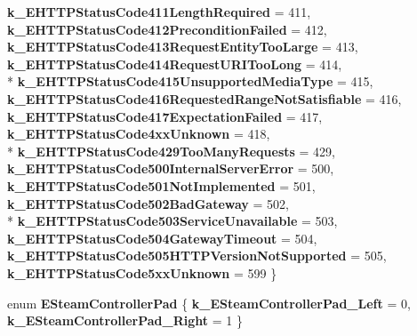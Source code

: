 \begin{DoxyCompactItemize}
{\bfseries k\+\_\+\+E\+H\+T\+T\+P\+Status\+Code411\+Length\+Required} = 411, 
{\bfseries k\+\_\+\+E\+H\+T\+T\+P\+Status\+Code412\+Precondition\+Failed} = 412, 
{\bfseries k\+\_\+\+E\+H\+T\+T\+P\+Status\+Code413\+Request\+Entity\+Too\+Large} = 413, 
{\bfseries k\+\_\+\+E\+H\+T\+T\+P\+Status\+Code414\+Request\+U\+R\+I\+Too\+Long} = 414, 
\\*
{\bfseries k\+\_\+\+E\+H\+T\+T\+P\+Status\+Code415\+Unsupported\+Media\+Type} = 415, 
{\bfseries k\+\_\+\+E\+H\+T\+T\+P\+Status\+Code416\+Requested\+Range\+Not\+Satisfiable} = 416, 
{\bfseries k\+\_\+\+E\+H\+T\+T\+P\+Status\+Code417\+Expectation\+Failed} = 417, 
{\bfseries k\+\_\+\+E\+H\+T\+T\+P\+Status\+Code4xx\+Unknown} = 418, 
\\*
{\bfseries k\+\_\+\+E\+H\+T\+T\+P\+Status\+Code429\+Too\+Many\+Requests} = 429, 
{\bfseries k\+\_\+\+E\+H\+T\+T\+P\+Status\+Code500\+Internal\+Server\+Error} = 500, 
{\bfseries k\+\_\+\+E\+H\+T\+T\+P\+Status\+Code501\+Not\+Implemented} = 501, 
{\bfseries k\+\_\+\+E\+H\+T\+T\+P\+Status\+Code502\+Bad\+Gateway} = 502, 
\\*
{\bfseries k\+\_\+\+E\+H\+T\+T\+P\+Status\+Code503\+Service\+Unavailable} = 503, 
{\bfseries k\+\_\+\+E\+H\+T\+T\+P\+Status\+Code504\+Gateway\+Timeout} = 504, 
{\bfseries k\+\_\+\+E\+H\+T\+T\+P\+Status\+Code505\+H\+T\+T\+P\+Version\+Not\+Supported} = 505, 
{\bfseries k\+\_\+\+E\+H\+T\+T\+P\+Status\+Code5xx\+Unknown} = 599
 \}\label{namespaceValve_1_1Steamworks_ab62fb77def417ee5c534d8dd0ccd7b7e}

\item 
\hypertarget{namespaceValve_1_1Steamworks_ae359def099042d0c6052b743569bafbe}{}enum {\bfseries E\+Steam\+Controller\+Pad} \{ {\bfseries k\+\_\+\+E\+Steam\+Controller\+Pad\+\_\+\+Left} = 0, 
{\bfseries k\+\_\+\+E\+Steam\+Controller\+Pad\+\_\+\+Right} = 1
 \}\label{namespaceValve_1_1Steamworks_ae359def099042d0c6052b743569bafbe}


\end{DoxyCompactItemize}
